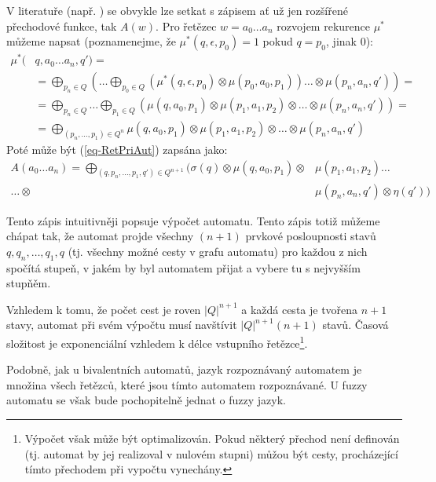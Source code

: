\documentclass[a4paper,10pt]{article}
\begin{document}
\begin{note}
  V literatuře (např. \cite{SebJoh-InvFuzzAutInvFuzzLang} \cite{IgnCirBog-DetFuzAutMemValComResLat} \cite{Bel-DetFuzAut}) se obvykle lze setkat s  zápisem ať už jen rozšířené přechodové funkce, tak $A(w)$. Pro řetězec $w = a_0 \dots a_n$ rozvojem rekurence $\mu^*$ můžeme napsat (poznamenejme, že $\mu^*(q, \epsilon, p_0) = 1$ pokud $q = p_0$, jinak $0$):
  \begin{align*}
   \mu^*(& q, a_0 \dots a_n, q') = \\
    &= \bigoplus_{p_n \in Q} \left( \dots \bigoplus_{p_0 \in Q} (\mu^*(q, \epsilon, p_0) \otimes \mu(p_0, a_0, p_1)) \dots \otimes \mu(p_n, a_n, q') \right) = \\
    &= \bigoplus_{p_n \in Q} \dots \bigoplus_{p_1 \in Q} \left( \mu(q, a_0, p_1) \otimes \mu(p_1, a_1, p_2) \otimes \dots \otimes \mu(p_n, a_n, q') \right) = \\
    &= \bigoplus_{(p_n,\dots, p_1) \in Q^n} \mu(q, a_0, p_1) \otimes \mu(p_1, a_1, p_2) \otimes \dots \otimes \mu(p_n, a_n, q')
  \end{align*}
  Poté může být (\ref{eq-RetPriAut}) zapsána jako:
  \begin{align*}
    A(a_0 \dots a_n) 
    = \bigoplus_{(q, p_n,\dots, p_1, q') \in Q^{n+1}} (\sigma(q) \otimes \mu(q, a_0, p_1) \otimes &\mu(p_1, a_1, p_2) \dots \\
     \dots \otimes &\mu(p_n, a_n, q') \otimes \eta(q'))
  \end{align*}

  Tento zápis intuitivněji popsuje výpočet automatu. Tento zápis totiž můžeme chápat tak, že automat projde všechny $(n+1)$ prvkové posloupnosti stavů $q, q_n, \dots, q_1, q$ (tj. všechny možné cesty v grafu automatu) pro každou z nich spočítá stupeň, v jakém by byl automatem přijat a vybere tu s nejvyšším stupňěm.
  
  Vzhledem k tomu, že počet cest je roven $|Q|^{n+1}$ a každá cesta je tvořena $n+1$ stavy, automat při svém výpočtu musí navštívit $|Q|^{n+1}(n+1)$ stavů. Časová složitost je exponenciální vzhledem k délce vstupního řetězce\footnote{Výpočet však může být optimalizován. Pokud některý přechod není definován (tj. automat by jej realizoval v nulovém stupni) můžou být cesty, procházející tímto přechodem při vypočtu vynechány.}.
\end{note}

Podobně, jak u bivalentních automatů, jazyk rozpoznávaný automatem je množina všech řetězců, které jsou tímto automatem rozpoznávané. U fuzzy automatu se však bude pochopitelně jednat o fuzzy jazyk.
\end{document}
